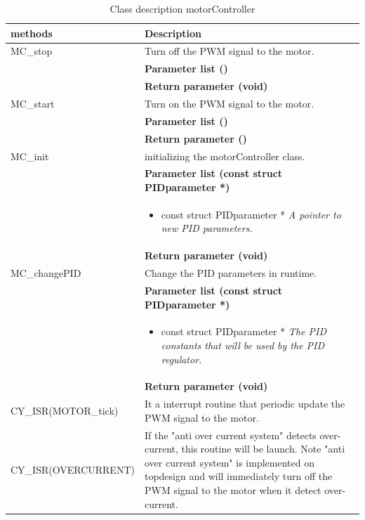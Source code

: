 \begin{table}[H]
	\centering
	\begin{tabular}{|p{5 cm}|p{10 cm}|}
		\hline
		\textbf{methods} & \textbf{Description} \\ \hline
		
		MC\_stop
		& Turn off the PWM signal to the motor.
		\\ & \textbf{Parameter list ()}
		\\ & \textbf{Return parameter (void)}
		\\ \hline
		
		MC\_start
		& Turn on the PWM signal to the motor.
		\\ & \textbf{Parameter list ()}
		\\ & \textbf{Return parameter ()}
		\\ \hline
		
		MC\_init
		& initializing the motorController class. 
		\\ & \textbf{Parameter list (const struct PIDparameter *)}
		\\ & \begin{itemize}
			\item {\large const struct PIDparameter *}
			\subitem \textit{A pointer to new PID parameters.}
		\end{itemize}
		\\ & \textbf{Return parameter (void)}
		\\ \hline
		
		MC\_changePID
		& Change the PID parameters in runtime.
		\\ & \textbf{Parameter list (const struct PIDparameter *)}
		\\ & \begin{itemize}
			\item {\large const struct PIDparameter *}
			\subitem \textit{The PID constants that will be used by the PID regulator.}
		\end{itemize}
		\\ & \textbf{Return parameter (void)}
		\\ \hline
		
		CY\_ISR(MOTOR\_tick)
		& It a interrupt routine that periodic update the PWM signal to the motor.
		\\ \hline
		
		CY\_ISR(OVERCURRENT)
		& If the "anti over current system" detects over-current, this routine will be launch. Note "anti over current system" is implemented on topdesign and will immediately turn off the PWM signal to the motor when it detect over-current.   
		\\ \hline
		
		
	\end{tabular}
	\caption{Class description motorController}
	\label{table:Class_description_motorController_MCU}
\end{table}

